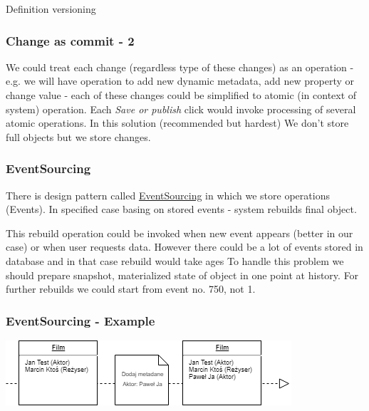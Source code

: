 \documentclass{beamer}
\begin{document}
\begin{section}{Definition versioning}
\begin{frame}
\end{frame}

\begin{frame}
\frametitle{Change as commit - 2}
We could treat each change (regardless type of these changes) as an operation - e.g. we will have operation to add new dynamic metadata, add new property or change value - each of these changes could be simplified to atomic (in context of system) operation. \newline \newline
Each \textit{Save or publish} click would invoke processing of several atomic operations.  In this solution (recommended but hardest) We don't store full objects but we store changes.
\end{frame}

\begin{frame}
\frametitle {EventSourcing}
There is design pattern called \href{https://martinfowler.com/eaaDev/EventSourcing.html}{EventSourcing} in which we store operations (Events). In specified case basing on stored events - system rebuilds final object. \pause \newline \newline

This rebuild operation could be invoked when new event appears (better in our case) or when user requests data. \newline \pause
However there could be a lot of events stored in database and in that case rebuild would take ages \pause \newline \newline To handle this problem we should prepare snapshot, materialized state of object in one point at history. For further rebuilds we could start from event no. 750, not 1. 
\end{frame}

\begin{frame}
\frametitle {EventSourcing - Example}

\begin{center}

 \includegraphics{EventSourcingBase.png}

\end{center}

\end{frame}


\end{section}
\end{document}
